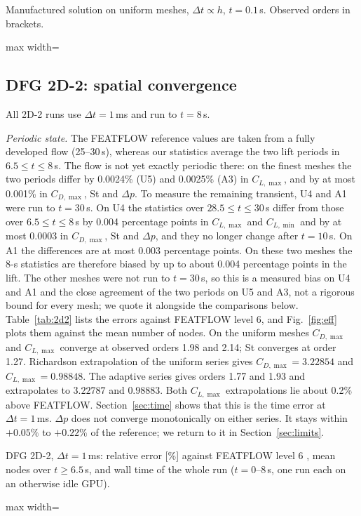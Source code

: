 \documentclass[preprint,12pt,number]{elsarticle}
\newcommand{\fittable}[1]{{\small\setlength{\tabcolsep}{4pt}\begin{adjustbox}{max width=\textwidth}\end{adjustbox}}}
\newcommand{\dt}{\Delta t}
\begin{document}
\begin{table}[!htbp]
\centering
\caption{Manufactured solution on uniform meshes, $\dt\propto h$, $t = 0.1\,$s.
Observed orders in brackets.}
\label{tab:mms}
\fittable{tables/tab_mms.tex}
\end{table}

\subsection{DFG 2D-2: spatial convergence}
\label{sec:2d2space}

All 2D-2 runs use $\dt = 1\,$ms and run to $t = 8\,$s.

\emph{Periodic state.} The FEATFLOW reference values are taken from a fully developed flow
(25--30\,s), whereas our statistics average the two lift periods in $6.5 \le t \le 8\,$s. The
flow is not yet exactly periodic there: on the finest meshes the two periods differ by
0.0024\% (U5) and 0.0025\% (A3) in $C_{L,\max}$, and by at most 0.001\% in $C_{D,\max}$, St and
$\Delta p$. To measure the remaining transient, U4 and A1 were run to $t = 30\,$s. On U4 the
statistics over $28.5 \le t \le 30\,$s differ from those over $6.5 \le t \le 8\,$s by 0.004
percentage points in $C_{L,\max}$ and $C_{L,\min}$ and by at most 0.0003 in $C_{D,\max}$, St and
$\Delta p$, and they no longer change after $t = 10\,$s. On A1 the differences are at most 0.003
percentage points. On these two meshes the 8-s statistics are therefore biased by up to about
0.004 percentage points in the lift. The other meshes were not run to $t = 30\,$s, so this is a
measured bias on U4 and A1 and the close agreement of the two periods on U5 and A3, not a
rigorous bound for every mesh; we quote it alongside the comparisons below.
 Table~\ref{tab:2d2} lists the errors
against FEATFLOW level 6, and Fig.~\ref{fig:eff} plots them against the mean number of nodes.
On the uniform meshes $C_{D,\max}$ and $C_{L,\max}$ converge at observed orders 1.98 and 2.14;
St converges at order 1.27. Richardson extrapolation of the uniform series gives
$C_{D,\max} = 3.22854$ and $C_{L,\max} = 0.98848$. The adaptive series gives orders 1.77 and
1.93 and extrapolates to $3.22787$ and $0.98883$. Both $C_{L,\max}$ extrapolations lie about
0.2\% above FEATFLOW. Section~\ref{sec:time} shows that this is the time error at
$\dt = 1\,$ms. $\Delta p$ does not converge monotonically on either series. It stays within
$+0.05\%$ to $+0.22\%$ of the reference; we return to it in Section~\ref{sec:limits}.

\begin{table}[!htbp]
\centering
\caption{DFG 2D-2, $\dt = 1\,$ms: relative error [\%] against FEATFLOW level 6
\citep{featflow}, mean nodes over $t\ge 6.5\,$s, and wall time of the whole run
($t = 0$--$8\,$s, one run each on an otherwise idle GPU).}
\label{tab:2d2}
\fittable{tables/tab_2d2.tex}
\end{table}
\end{document}
